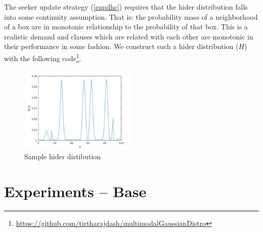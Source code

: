 \documentclass[11pt,a4paper]{article}
\begin{document}
\noindent
The seeker update strategy (\ref{supdhc}) requires that the hider distribution falls into some continuity assumption. That is: the probability mass of a neighborhood of a box are in monotonic relationship to the probability of that box. This is a realistic demand and clauses which are related with each other are monotonic in their performance in some fashion. We construct such a hider distribution ($H$) with the following code\footnote{\url{https://github.com/tirtharajdash/multimodalGaussianDistro}}.

\begin{figure}[h]
	\centering
	\includegraphics[width=0.5\textwidth]{sample.jpg}
	\caption{Sample hider distibution}
\end{figure}
	

\section{Experiments -- Base} \label{base_expt}
\end{document}
